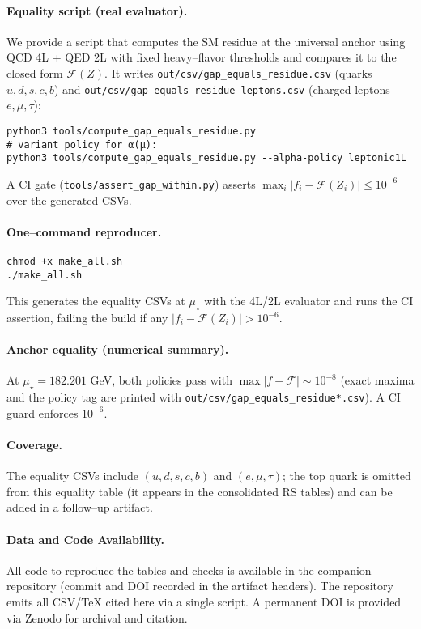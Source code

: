 \documentclass[epjc3]{svjour3}
\begin{document}
\paragraph{Equality script (real evaluator).}
We provide a script that computes the SM residue at the universal anchor using QCD 4L + QED 2L with fixed heavy--flavor thresholds and compares it to the closed form $\mathcal F(Z)$. It writes
\texttt{out/csv/gap\_equals\_residue.csv} (quarks $u,d,s,c,b$) and \texttt{out/csv/gap\_equals\_residue\_leptons.csv} (charged leptons $e,\mu,\tau$):
\begin{verbatim}
python3 tools/compute_gap_equals_residue.py
# variant policy for α(μ):
python3 tools/compute_gap_equals_residue.py --alpha-policy leptonic1L
\end{verbatim}
A CI gate (\texttt{tools/assert\_gap\_within.py}) asserts $\max_i |f_i-\mathcal F(Z_i)|\le 10^{-6}$ over the generated CSVs.

\paragraph{One--command reproducer.}
\begin{verbatim}
chmod +x make_all.sh
./make_all.sh
\end{verbatim}
This generates the equality CSVs at $\mu_\star$ with the 4L/2L evaluator and runs the CI assertion, failing the build if any $|f_i-\mathcal F(Z_i)|>10^{-6}$.

\paragraph{Anchor equality (numerical summary).}
At $\mu_\star=182.201$ GeV, both policies pass with $\max|f-\mathcal F|\sim10^{-8}$ (exact maxima and the policy tag are printed with \texttt{out/csv/gap\_equals\_residue*.csv}). A CI guard enforces $10^{-6}$.

\paragraph{Coverage.}
The equality CSVs include $(u,d,s,c,b)$ and $(e,\mu,\tau)$; the top quark is omitted from this equality table (it appears in the consolidated RS tables) and can be added in a follow--up artifact.

\paragraph{Data and Code Availability.}
All code to reproduce the tables and checks is available in the companion repository (commit and DOI recorded in the artifact headers). The repository emits all CSV/TeX cited here via a single script. A permanent DOI is provided via Zenodo for archival and citation.
\end{document}
